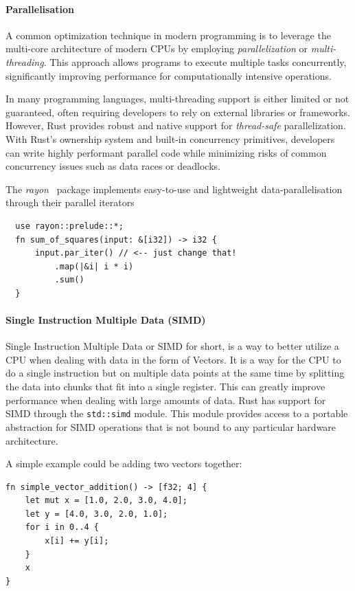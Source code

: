 \documentclass[11pt]{report}
\theoremstyle{definition}
\theoremstyle{plain}
\begin{document}
\paragraph{Parallelisation}
A common optimization technique in modern programming is to leverage the multi-core architecture of modern CPUs by employing \textit{parallelization} or \textit{multi-threading}. This approach allows programs to execute multiple tasks concurrently, significantly improving performance for computationally intensive operations.

In many programming languages, multi-threading support is either limited or not guaranteed, often requiring developers to rely on external libraries or frameworks. However, Rust provides robust and native support for \textit{thread-safe} parallelization. With Rust's ownership system and built-in concurrency primitives, developers can write highly performant parallel code while minimizing risks of common concurrency issues such as data races or deadlocks.

The \textit{rayon}~\cite{rayon} package implements easy-to-use and lightweight data-parallelisation through their parallel iterators
\begin{verbatim}
  use rayon::prelude::*;
  fn sum_of_squares(input: &[i32]) -> i32 {
      input.par_iter() // <-- just change that!
          .map(|&i| i * i)
          .sum()
  }
\end{verbatim}

\paragraph{Single Instruction Multiple Data (SIMD)}
Single Instruction Multiple Data or SIMD for short, is a way to better utilize a CPU when dealing with data in the form of Vectors. It is a way for the CPU to do a single instruction but on multiple data points at the same time by splitting the data into chunks that fit into a single register. This can greatly improve performance when dealing with large amounts of data. Rust has support for SIMD through the \texttt{std::simd} module. This module provides access to a portable abstraction for SIMD operations that is not bound to any particular hardware architecture.

A simple example could be adding two vectors together:
\begin{verbatim}
fn simple_vector_addition() -> [f32; 4] {
    let mut x = [1.0, 2.0, 3.0, 4.0];
    let y = [4.0, 3.0, 2.0, 1.0];
    for i in 0..4 {
        x[i] += y[i];
    }
    x
}

\end{verbatim}
\end{document}
